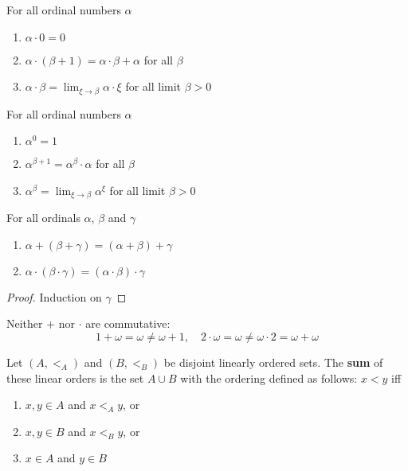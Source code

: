 \documentclass[11pt]{article}
\begin{document}
\begin{definition}[Multiplication]
For all ordinal numbers \(\alpha\)
\begin{enumerate}
\item \(\alpha\cdot 0=0\)
\item \(\alpha\cdot(\beta+1)=\alpha\cdot\beta+\alpha\) for all \(\beta\)
\item \(\alpha\cdot\beta=\lim_{\xi\to\beta}\alpha\cdot\xi\) for all limit \(\beta>0\)
\end{enumerate}
\end{definition}

\begin{definition}[Exponentiation]
For all ordinal numbers \(\alpha\)
\begin{enumerate}
\item \(\alpha^0=1\)
\item \(\alpha^{\beta+1}=\alpha^\beta\cdot\alpha\) for all \(\beta\)
\item \(\alpha^\beta=\lim_{\xi\to\beta}\alpha^\xi\) for all limit \(\beta>0\)
\end{enumerate}
\end{definition}

\begin{lemma}[]
For all ordinals \(\alpha\), \(\beta\) and \(\gamma\)
\begin{enumerate}
\item \(\alpha+(\beta+\gamma)=(\alpha+\beta)+\gamma\)
\item \(\alpha\cdot(\beta\cdot\gamma)=(\alpha\cdot\beta)\cdot\gamma\)
\end{enumerate}
\end{lemma}

\begin{proof}
Induction on \(\gamma\)
\end{proof}

Neither + nor \(\cdot\) are commutative:
\begin{equation*}
1+\omega=\omega\neq\omega+1,\quad 2\cdot\omega=\omega\neq\omega\cdot 2=\omega+\omega
\end{equation*}

\begin{definition}[]
Let \((A,<_A)\) and \((B,<_B)\) be disjoint linearly ordered sets. The \textbf{sum} of these linear
orders is the set \(A\cup B\) with the ordering defined as follows: \(x<y\) iff
\begin{enumerate}
\item \(x,y\in A\) and \(x<_Ay\), or
\item \(x,y\in B\) and \(x<_By\), or
\item \(x\in A\) and \(y\in B\)
\end{enumerate}
\end{definition}
\end{document}

